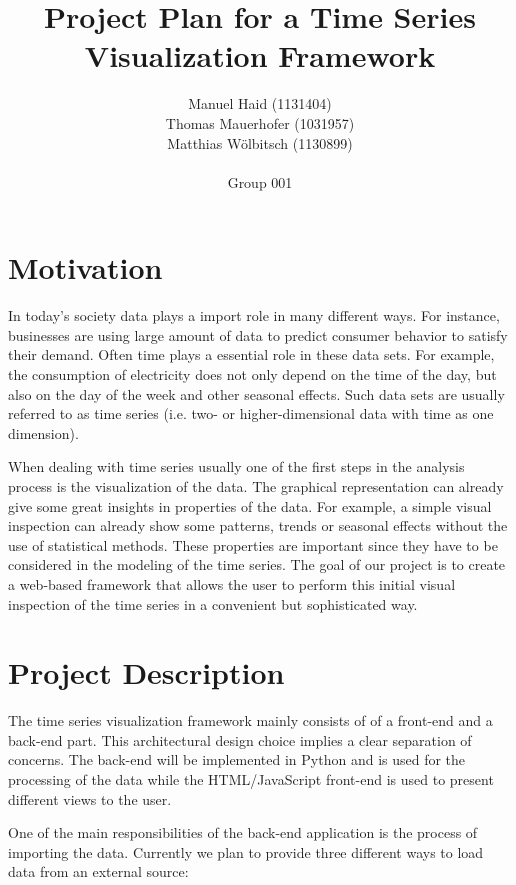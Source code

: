 \documentclass[12pt, a4paper]{article}
\author{Manuel Haid (1131404) \\ Thomas Mauerhofer (1031957) \\ Matthias Wölbitsch (1130899) \\ \\ Group 001}
\title{Project Plan for a Time Series Visualization Framework}
\date{}
\begin{document}
\maketitle


\section{Motivation}

In today's society data plays a import role in many different ways.
For instance, businesses are using large amount of data to predict consumer behavior to satisfy their demand.
Often time plays a essential role in these data sets. 
For example, the consumption of electricity does not only depend on the time of the day, but also on the day of the week and other seasonal effects.
Such data sets are usually referred to as time series (i.e. two- or higher-dimensional data with time as one dimension). 

When dealing with time series usually one of the first steps in the analysis process is the visualization of the data.
The graphical representation can already give some great insights in properties of the data.
For example, a simple visual inspection can already show some patterns, trends or seasonal effects without the use of statistical methods. 
These properties are important since they have to be considered in the modeling of the time series.
The goal of our project is to create a web-based framework that allows the user to perform this initial visual inspection of the time series in a convenient but sophisticated way.


\section{Project Description}

The time series visualization framework mainly consists of of a front-end and a back-end part.
This architectural design choice implies a clear separation of concerns. 
The back-end will be implemented in Python and is used for the processing of the data while the HTML/JavaScript front-end is used to present different views to the user.

One of the main responsibilities of the back-end application is the process of importing the data.
Currently we plan to provide three different ways to load data from an external source:
\end{document}
